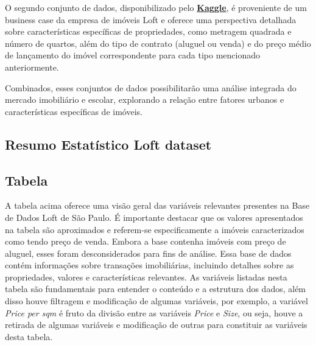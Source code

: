 O segundo conjunto de dados, disponibilizado pelo \href{https://www.kaggle.com/code/argonalyst/an-lise-business-case-ds-loft}{\textbf{Kaggle}}, é proveniente de um business case da empresa de imóveis Loft e oferece uma perspectiva detalhada sobre características específicas de propriedades, como metragem quadrada e número de quartos, além do tipo de contrato (aluguel ou venda) e do preço médio de lançamento do imóvel correspondente para cada tipo mencionado anteriormente.

Combinados, esses conjuntos de dados possibilitarão uma análise integrada do mercado imobiliário e escolar, explorando a relação entre fatores urbanos e características específicas de imóveis.


% 

\subsection{Resumo Estatístico Loft dataset}
\subsection*{Tabela}



A tabela acima oferece uma visão geral das variáveis relevantes presentes na Base de Dados Loft de São Paulo. É importante destacar que os valores apresentados na tabela são aproximados e referem-se especificamente a imóveis caracterizados como tendo preço de venda. Embora a base contenha imóveis com preço de aluguel, esses foram desconsiderados para fins de análise. Essa base de dados contém informações sobre transações imobiliárias, incluindo detalhes sobre as propriedades, valores e características relevantes. As variáveis listadas nesta tabela são fundamentais para entender o conteúdo e a estrutura dos dados, além disso houve filtragem e modificação de algumas variáveis, por exemplo, a variável \textit{Price per sqm} é fruto da divisão entre as variáveis \textit{Price} e \textit{Size}, ou seja, houve a retirada de algumas variáveis e modificação de outras para constituir as variáveis desta tabela. 


